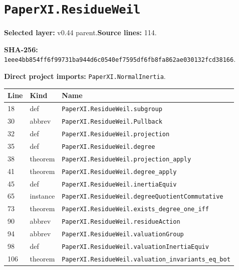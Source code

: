 \documentclass[10pt,oneside]{book}
\begin{document}
\section{\texorpdfstring{\nolinkurl{PaperXI.ResidueWeil}}{PaperXI.ResidueWeil}}\label{module:PaperXI.ResidueWeil}

\textbf{Selected layer:} v0.44 parent.\quad\textbf{Source lines:} 114.\par\textbf{SHA-256:} {\scriptsize\nolinkurl{1eee4bb854ff6f99731ba944d6c0540ef7595df6fb8fa862ae030132fcd38166}}.


\textbf{Direct project imports:} \nolinkurl{PaperXI.NormalInertia}.

\begin{longtable}{@{}p{}p{}p{}@{}}\toprule Line&Kind&Name\\\midrule\endhead

18&def&\nolinkurl{PaperXI.ResidueWeil.subgroup}\\

30&abbrev&\nolinkurl{PaperXI.ResidueWeil.Pullback}\\

32&def&\nolinkurl{PaperXI.ResidueWeil.projection}\\

35&def&\nolinkurl{PaperXI.ResidueWeil.degree}\\

38&theorem&\nolinkurl{PaperXI.ResidueWeil.projection_apply}\\

41&theorem&\nolinkurl{PaperXI.ResidueWeil.degree_apply}\\

45&def&\nolinkurl{PaperXI.ResidueWeil.inertiaEquiv}\\

65&instance&\nolinkurl{PaperXI.ResidueWeil.degreeQuotientCommutative}\\

73&theorem&\nolinkurl{PaperXI.ResidueWeil.exists_degree_one_iff}\\

90&abbrev&\nolinkurl{PaperXI.ResidueWeil.residueAction}\\

94&abbrev&\nolinkurl{PaperXI.ResidueWeil.valuationGroup}\\

98&def&\nolinkurl{PaperXI.ResidueWeil.valuationInertiaEquiv}\\

106&theorem&\nolinkurl{PaperXI.ResidueWeil.valuation_invariants_eq_bot}\\

\bottomrule\end{longtable}
\end{document}
